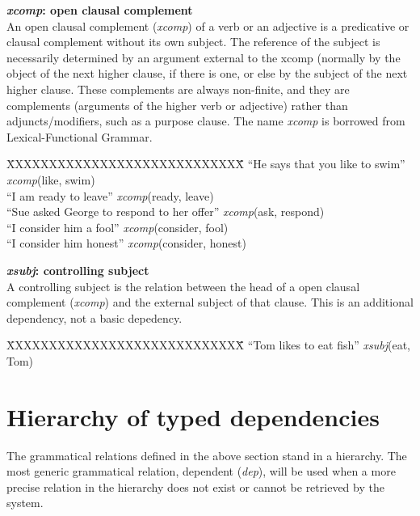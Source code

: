 \documentclass[11pt,letterpaper]{article}
\begin{document}
\noindent\textbf{\emph{xcomp}: open clausal complement}\\
An open clausal complement (\emph{xcomp}) of a verb or an adjective is
a predicative or clausal complement without its own subject. The
reference of the subject is necessarily determined by an argument
external to the xcomp (normally by the object of the next higher
clause, if there is one, or else by the subject of the next higher clause.  
These complements are always non-finite, and they are complements
(arguments of the higher verb or adjective) rather than
adjuncts/modifiers, such as a purpose clause.
The name \emph{xcomp} is borrowed from Lexical-Functional Grammar.
\begin{tabbing}
	\hspace{1cm} \=XXXXXXXXXXXXXXXXXXXXXXXXXXXX\= \hspace{1cm}\=  \kill
\>  ``He says that you like to swim'' \> \> \emph{xcomp}(like, swim)\\
\hspace{1cm} \> ``I am ready to leave'' \> \>  \emph{xcomp}(ready, leave)\\
\> ``Sue asked George to respond to her offer'' \> \> \emph{xcomp}(ask, respond) \\
\> ``I consider him a fool'' \> \> \emph{xcomp}(consider, fool) \\
\> ``I consider him honest'' \> \> \emph{xcomp}(consider, honest) \\
\end{tabbing}

\noindent\textbf{\emph{xsubj}: controlling subject}\\
A controlling subject is the relation between the head of a open clausal complement (\emph{xcomp}) and the external subject of that clause.
This is an additional dependency, not a basic depedency.
\begin{tabbing}
	\hspace{1cm} \=XXXXXXXXXXXXXXXXXXXXXXXXXXXX\= \hspace{1cm}\=  \kill
\> ``Tom likes to eat fish'' \> \> \emph{xsubj}(eat, Tom)\\
\end{tabbing}

\section{Hierarchy of typed dependencies}\label{hierarchy}
The grammatical relations defined in the above section stand in a hierarchy. The most generic grammatical relation, dependent (\emph{dep}), will be used when a more precise relation in the hierarchy does not exist or cannot be retrieved by the system.
\end{document}
